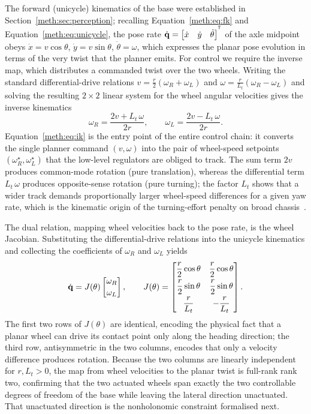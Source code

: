 The forward (unicycle) kinematics of the base were established in Section~\ref{meth:sec:perception}; recalling Equation~\eqref{meth:eq:fk} and Equation~\eqref{meth:eq:unicycle}, the pose rate $\dot{\mathbf{q}}=\begin{bmatrix}\dot x & \dot y & \dot\theta\end{bmatrix}^{^{\mathsf{T}}}$ of the axle midpoint obeys $\dot x = v\cos\theta$, $\dot y = v\sin\theta$, $\dot\theta=\omega$, which expresses the planar pose evolution in terms of the very twist that the planner emits. For control we require the inverse map, which distributes a commanded twist over the two wheels. Writing the standard differential-drive relations $v=\tfrac{r}{2}(\omega_R+\omega_L)$ and $\omega=\tfrac{r}{L_t}(\omega_R-\omega_L)$ and solving the resulting $2\times 2$ linear system for the wheel angular velocities gives the inverse kinematics
\begin{equation}\label{meth:eq:ik}
\omega_R = \frac{2v + L_t\,\omega}{2r},
\qquad
\omega_L = \frac{2v - L_t\,\omega}{2r}.
\end{equation}
Equation~\eqref{meth:eq:ik} is the entry point of the entire control chain: it converts the single planner command $(v,\omega)$ into the pair of wheel-speed setpoints $(\omega_R^{\star},\omega_L^{\star})$ that the low-level regulators are obliged to track. The sum term $2v$ produces common-mode rotation (pure translation), whereas the differential term $L_t\,\omega$ produces opposite-sense rotation (pure turning); the factor $L_t$ shows that a wider track demands proportionally larger wheel-speed differences for a given yaw rate, which is the kinematic origin of the turning-effort penalty on broad chassis~\cite{siegwart2011mobile}.

The dual relation, mapping wheel velocities back to the pose rate, is the wheel Jacobian. Substituting the differential-drive relations into the unicycle kinematics and collecting the coefficients of $\omega_R$ and $\omega_L$ yields
\begin{equation}\label{meth:eq:jac}
\dot{\mathbf{q}}
= J(\theta)\begin{bmatrix}\omega_R\\[2pt]\omega_L\end{bmatrix},
\qquad
J(\theta)=
\begin{bmatrix}
\dfrac{r}{2}\cos\theta & \dfrac{r}{2}\cos\theta\\[6pt]
\dfrac{r}{2}\sin\theta & \dfrac{r}{2}\sin\theta\\[6pt]
\dfrac{r}{L_t} & -\dfrac{r}{L_t}
\end{bmatrix}.
\end{equation}
The first two rows of $J(\theta)$ are identical, encoding the physical fact that a planar wheel can drive its contact point only along the heading direction; the third row, antisymmetric in the two columns, encodes that only a velocity difference produces rotation. Because the two columns are linearly independent for $r,L_t>0$, the map from wheel velocities to the planar twist is full-rank rank two, confirming that the two actuated wheels span exactly the two controllable degrees of freedom of the base while leaving the lateral direction unactuated. That unactuated direction is the nonholonomic constraint formalised next.

